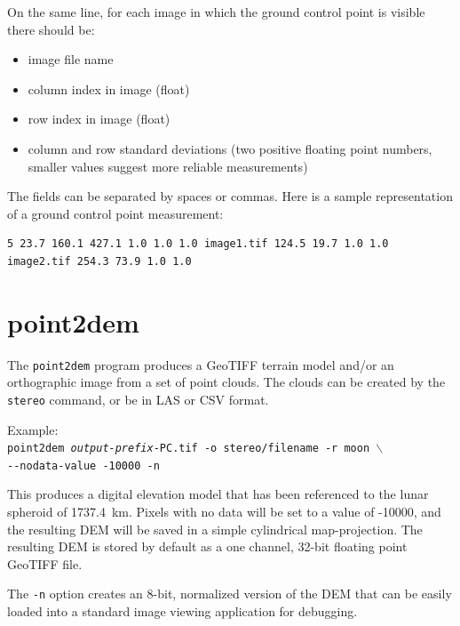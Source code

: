 On the same line, for each image in which the ground control point is
visible there should be:

\begin{itemize}
\item image file name
\item column index in image (float)
\item row index in image (float)
\item column and row standard deviations (two positive floating point
  numbers, smaller values suggest more reliable measurements)
\end{itemize}

The fields can be separated by spaces or commas. Here is a sample representation
of a ground control point measurement:

\begin{verbatim}
5 23.7 160.1 427.1 1.0 1.0 1.0 image1.tif 124.5 19.7 1.0 1.0 image2.tif 254.3 73.9 1.0 1.0
\end{verbatim}


\section{point2dem}
\label{point2dem}

The \texttt{point2dem} program produces a GeoTIFF terrain model and/or
an orthographic image from a set of point clouds. The clouds can be
created by the {\tt stereo} command, or be in LAS or CSV format.

Example:\\
\hspace*{2em}\texttt{point2dem \textit{output-prefix}-PC.tif -o stereo/filename -r moon $\backslash$} \\
\hspace*{4em}\texttt{-\/-nodata-value -10000 -n}

This produces a digital elevation model that has been referenced to
the lunar spheroid of 1737.4~km.  Pixels with no data will be set to a
value of -10000, and the resulting \ac{DEM} will be saved in a simple
cylindrical map-projection.  The resulting \ac{DEM} is stored by default as
a one channel, 32-bit floating point GeoTIFF file.

The {\tt -n} option creates an 8-bit, normalized version of the DEM
that can be easily loaded into a standard image viewing application
for debugging.

